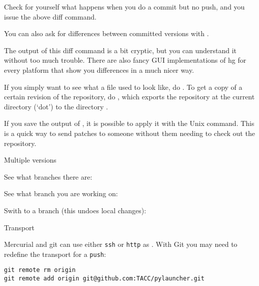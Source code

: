 Check for yourself what happens when you do a commit but no push, and 
you issue the above diff command.

You can also ask for differences between committed versions with
.

The output of this diff command is a bit cryptic, but you can
understand it without too much trouble. There are also fancy GUI
implementations of hg for every platform that show you differences in
a much nicer way.

If you simply want to see what a file used to look like, do . To get a copy of a certain revision of the
repository, do , which exports the
repository at the current directory (`dot') to the directory .

If you save the output of , it is possible to apply it
with the Unix  command. This is a quick way to send patches
to someone without them needing to check out the repository.

\begin{notready}
   {Multiple versions}

  See what branches there are: 

  See what branch you are working on: 

  Swith to a branch (this undoes local changes): 
\end{notready}

 {Transport}

Mercurial and git can use either \texttt{ssh} or \texttt{http} as
%
%
.
With Git you may need to redefine the transport for a \texttt{push}:
\begin{verbatim}
git remote rm origin
git remote add origin git@github.com:TACC/pylauncher.git
\end{verbatim}

